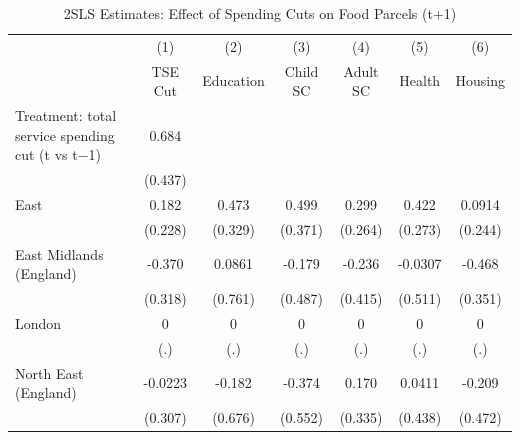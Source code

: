 \begin{table}[htbp]\centering
\def\sym#1{\ifmmode^{#1}\else\(^{#1}\)\fi}
\caption{2SLS Estimates: Effect of Spending Cuts on Food Parcels (t+1)}
\begin{tabular}{l*{6}{c}}
\toprule
                    &\multicolumn{1}{c}{(1)}&\multicolumn{1}{c}{(2)}&\multicolumn{1}{c}{(3)}&\multicolumn{1}{c}{(4)}&\multicolumn{1}{c}{(5)}&\multicolumn{1}{c}{(6)}\\
                    &\multicolumn{1}{c}{TSE Cut}&\multicolumn{1}{c}{Education}&\multicolumn{1}{c}{Child SC}&\multicolumn{1}{c}{Adult SC}&\multicolumn{1}{c}{Health}&\multicolumn{1}{c}{Housing}\\
\midrule
Treatment: total service spending cut (t vs t−1)&       0.684         &                     &                     &                     &                     &                     \\
                    &     (0.437)         &                     &                     &                     &                     &                     \\
\addlinespace
East                &       0.182         &       0.473         &       0.499         &       0.299         &       0.422         &      0.0914         \\
                    &     (0.228)         &     (0.329)         &     (0.371)         &     (0.264)         &     (0.273)         &     (0.244)         \\
\addlinespace
East Midlands (England)&      -0.370         &      0.0861         &      -0.179         &      -0.236         &     -0.0307         &      -0.468         \\
                    &     (0.318)         &     (0.761)         &     (0.487)         &     (0.415)         &     (0.511)         &     (0.351)         \\
\addlinespace
London              &           0         &           0         &           0         &           0         &           0         &           0         \\
                    &         (.)         &         (.)         &         (.)         &         (.)         &         (.)         &         (.)         \\
\addlinespace
North East (England)&     -0.0223         &      -0.182         &      -0.374         &       0.170         &      0.0411         &      -0.209         \\
                    &     (0.307)         &     (0.676)         &     (0.552)         &     (0.335)         &     (0.438)         &     (0.472)         \\

\end{tabular}
\end{table}

